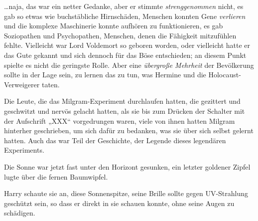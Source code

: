 …naja, das war ein netter Gedanke, aber er stimmte \emph{strenggenommen} nicht, es gab so etwas wie buchstäbliche Hirnschäden, Menschen konnten Gene \emph{verlieren} und die komplexe Maschinerie konnte aufhören zu funktionieren, es gab Soziopathen und Psychopathen, Menschen, denen die Fähigkeit mitzufühlen fehlte. Vielleicht war Lord Voldemort so geboren worden, oder vielleicht hatte er das Gute gekannt und sich dennoch für das Böse entschieden; an diesem Punkt spielte es nicht die geringste Rolle. Aber eine \emph{übergroße Mehrheit} der Bevölkerung sollte in der Lage sein, zu lernen das zu tun, was Hermine und die Holocaust-Verweigerer taten.

Die Leute, die das Milgram-Experiment durchlaufen hatten, die gezittert und geschwitzt und nervös gelacht hatten, als sie bis zum Drücken der Schalter mit der Aufschrift „XXX“ vorgedrungen waren, viele von ihnen hatten Milgram hinterher geschrieben, um sich dafür zu bedanken, was sie über sich selbst gelernt hatten. Auch das war Teil der Geschichte, der Legende dieses legendären Experiments.

Die Sonne war jetzt fast unter den Horizont gesunken, ein letzter goldener Zipfel lugte über die fernen Baumwipfel.

Harry schaute sie an, diese Sonnenspitze, seine Brille sollte gegen UV-Strahlung geschützt sein, so dass er direkt in sie schauen konnte, ohne seine Augen zu schädigen.

